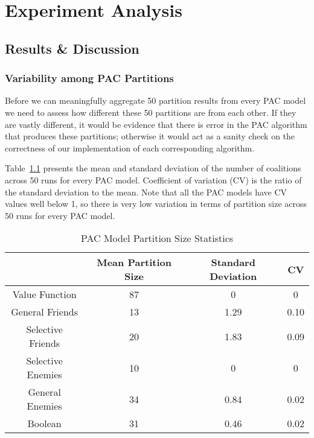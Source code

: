 
\chapter{Experiment Analysis}
\label{ch:analysis}
\vspace{2em}

\section{Results \& Discussion}
\label{sec:results_and_discussion}

\subsection{Variability among PAC Partitions}
\label{subsec:variability_among_pac_partitions}

Before we can meaningfully aggregate 50 partition results from every PAC model
we need to assess how different these 50 partitions are from each other.
If they are vastly different, it would be evidence that there is error in the
PAC algorithm that produces these partitions; otherwise it would act as a sanity
check on the correctness of our implementation of each corresponding algorithm.

Table~\ref{analysis:table:pac_num_coalitions} presents the mean and standard
deviation of the number of coalitions across 50 runs for every PAC model.
Coefficient of variation (CV) is the ratio of the standard deviation to the mean.
Note that all the PAC models have CV values well below 1, so there is very low
variation in terms of partition size across 50 runs for every PAC model.

\begin{table}[h!]
\centering
\begin{tabular}{|c|c|c|c|}
\hline
       & Mean Partition Size & Standard Deviation & CV \\ \hline
Value Function & 87 & 0 & 0 \\
General Friends & 13 & 1.29 & 0.10  \\
Selective Friends & 20 & 1.83 & 0.09  \\
Selective Enemies & 10 & 0 & 0 \\
General Enemies & 34 & 0.84 & 0.02 \\
Boolean & 31 & 0.46 & 0.02  \\
\hline
\end{tabular}
\caption{PAC Model Partition Size Statistics}
\label{analysis:table:pac_num_coalitions}
\end{table}

